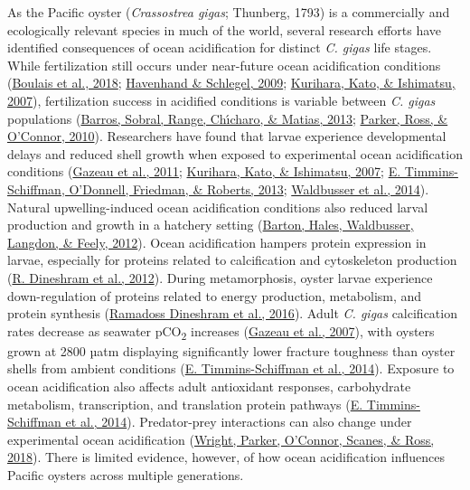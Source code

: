 \documentclass [11pt, proquest] {uwthesis}[2015/03/03]
\begin{document}
As the Pacific oyster (\emph{Crassostrea gigas}; Thunberg, 1793) is a commercially and ecologically relevant species in much of the world, several research efforts have identified consequences of ocean acidification for distinct \emph{C. gigas} life stages. While fertilization still occurs under near-future ocean acidification conditions (\protect\hyperlink{ref-Boulais2018}{Boulais et al., 2018}; \protect\hyperlink{ref-Havenhand2009}{Havenhand \& Schlegel, 2009}; \protect\hyperlink{ref-Kurihara2007}{Kurihara, Kato, \& Ishimatsu, 2007}), fertilization success in acidified conditions is variable between \emph{C. gigas} populations (\protect\hyperlink{ref-Barros2013}{Barros, Sobral, Range, Chı́charo, \& Matias, 2013}; \protect\hyperlink{ref-Parker2010}{Parker, Ross, \& O'Connor, 2010}). Researchers have found that larvae experience developmental delays and reduced shell growth when exposed to experimental ocean acidification conditions (\protect\hyperlink{ref-Gazeau2011}{Gazeau et al., 2011}; \protect\hyperlink{ref-Kurihara2007}{Kurihara, Kato, \& Ishimatsu, 2007}; \protect\hyperlink{ref-Timmins-Schiffman2013}{E. Timmins-Schiffman, O'Donnell, Friedman, \& Roberts, 2013}; \protect\hyperlink{ref-Waldbusser2014}{Waldbusser et al., 2014}). Natural upwelling-induced ocean acidification conditions also reduced larval production and growth in a hatchery setting (\protect\hyperlink{ref-Barton2012}{Barton, Hales, Waldbusser, Langdon, \& Feely, 2012}). Ocean acidification hampers protein expression in larvae, especially for proteins related to calcification and cytoskeleton production (\protect\hyperlink{ref-Dineshram2012}{R. Dineshram et al., 2012}). During metamorphosis, oyster larvae experience down-regulation of proteins related to energy production, metabolism, and protein synthesis (\protect\hyperlink{ref-Dineshram2016}{Ramadoss Dineshram et al., 2016}). Adult \emph{C. gigas} calcification rates decrease as seawater pCO\textsubscript{2} increases (\protect\hyperlink{ref-Gazeau2007}{Gazeau et al., 2007}), with oysters grown at 2800 µatm displaying significantly lower fracture toughness than oyster shells from ambient conditions (\protect\hyperlink{ref-Timmins-Schiffman2014}{E. Timmins-Schiffman et al., 2014}). Exposure to ocean acidification also affects adult antioxidant responses, carbohydrate metabolism, transcription, and translation protein pathways (\protect\hyperlink{ref-Timmins-Schiffman2014}{E. Timmins-Schiffman et al., 2014}). Predator-prey interactions can also change under experimental ocean acidification (\protect\hyperlink{ref-Wright2018}{Wright, Parker, O'Connor, Scanes, \& Ross, 2018}). There is limited evidence, however, of how ocean acidification influences Pacific oysters across multiple generations.
\end{document}
